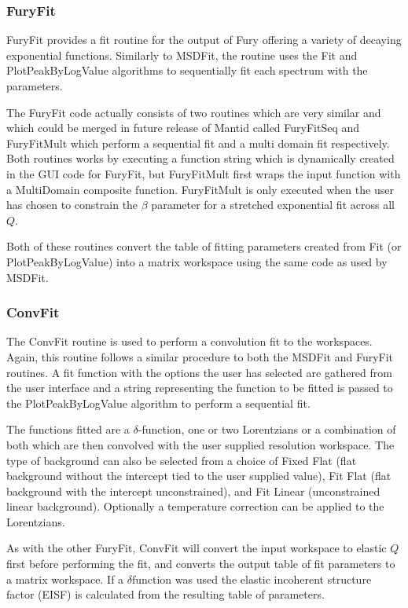 \documentclass[paper=a4, fontsize=11pt]{scrartcl}	%
\numberwithin{equation}{section}															%
\numberwithin{figure}{section}																%
\numberwithin{table}{section}																%
\begin{document}
\subsubsection{FuryFit}
FuryFit provides a fit routine for the output of Fury offering a variety of decaying exponential functions. Similarly to MSDFit, the routine uses the Fit and PlotPeakByLogValue algorithms to sequentially fit each spectrum with the parameters.

The FuryFit code actually consists of two routines which are very similar and which could be merged in future release of Mantid called FuryFitSeq and FuryFitMult which perform a sequential fit and a multi domain fit respectively. Both routines works by executing a function string which is dynamically created in the GUI code for FuryFit, but FuryFitMult first wraps the input function with a MultiDomain composite function. FuryFitMult is only executed when the user has chosen to constrain the $\beta$ parameter for a stretched exponential fit across all $Q$.

Both of these routines convert the table of fitting parameters created from Fit (or PlotPeakByLogValue) into a matrix workspace using the same code as used by MSDFit.

\subsubsection{ConvFit}
The ConvFit routine is used to perform a convolution fit to the workspaces. Again, this routine follows a similar procedure to both the MSDFit and FuryFit routines. A fit function with the options the user has selected are gathered from the user interface and a string representing the function to be fitted is passed to the PlotPeakByLogValue algorithm to perform a sequential fit.

The functions fitted are a $\delta$-function, one or two Lorentzians or a combination of both which are then convolved with the user supplied resolution workspace. The type of background can also be selected from a choice of Fixed Flat (flat background without the intercept tied to the user supplied value), Fit Flat (flat background with the intercept unconstrained), and Fit Linear (unconstrained linear background). Optionally a temperature correction can be applied to the Lorentzians.

As with the other FuryFit, ConvFit will convert the input workspace to elastic $Q$ first before performing the fit, and converts the output table of fit parameters to a matrix workspace. If a $\delta$function was used the elastic incoherent structure factor (EISF) is calculated from the resulting table of parameters.
\end{document}
